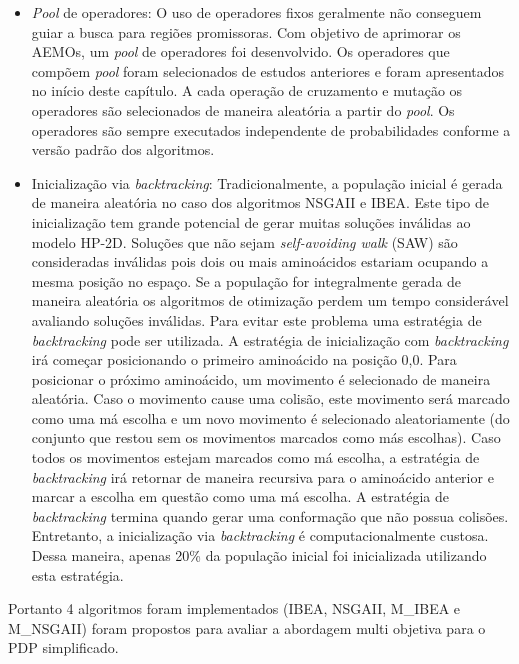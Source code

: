 
 \begin{itemize}
 		
		\item \textit{Pool} de operadores: O uso de operadores fixos geralmente não conseguem guiar a busca para regiões promissoras. Com objetivo de aprimorar os AEMOs, um \textit{pool} de operadores foi desenvolvido. Os operadores que compõem \textit{pool} foram selecionados de estudos anteriores e foram apresentados no início deste capítulo. A cada operação de cruzamento e mutação os operadores são selecionados de maneira aleatória a partir do \textit{pool}. Os operadores são sempre executados independente de probabilidades conforme a versão padrão dos algoritmos. 
	
		
		\item Inicialização via \textit{backtracking}: Tradicionalmente, a população inicial é gerada de maneira aleatória no caso dos algoritmos NSGAII e IBEA. Este tipo de inicialização tem grande potencial de gerar muitas soluções inválidas ao  modelo HP-2D. Soluções que não sejam \textit{self-avoiding walk} (SAW) são consideradas inválidas pois dois ou mais aminoácidos estariam ocupando a mesma posição no espaço. Se a população for integralmente gerada de maneira aleatória os algoritmos de otimização perdem um tempo considerável avaliando soluções inválidas. Para evitar este problema uma estratégia de \textit{backtracking} pode ser utilizada. A estratégia de inicialização com \textit{backtracking} irá começar posicionando o primeiro aminoácido na posição 0,0. Para posicionar o próximo aminoácido, um movimento é selecionado de maneira aleatória. Caso o movimento cause uma colisão, este movimento será marcado como uma má escolha e um novo movimento é selecionado aleatoriamente (do conjunto que restou sem os movimentos marcados como más escolhas). Caso todos os movimentos estejam marcados como má escolha, a estratégia de \textit{backtracking} irá retornar de maneira recursiva para o aminoácido anterior e marcar a escolha em questão como uma má escolha. A estratégia de \textit{backtracking} termina quando gerar uma conformação que não possua colisões. Entretanto, a inicialização via \textit{backtracking} é computacionalmente custosa. Dessa maneira, apenas 20\% da população inicial foi inicializada utilizando esta estratégia.

\end{itemize}

Portanto 4 algoritmos foram implementados (IBEA, NSGAII, M\_IBEA e M\_NSGAII) foram propostos para avaliar a abordagem multi objetiva para o PDP simplificado.


